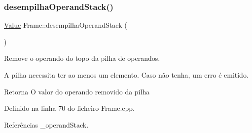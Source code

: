 \subsubsection{\texorpdfstring{desempilha\+Operand\+Stack()}{desempilhaOperandStack()}}
{\footnotesize\ttfamily \hyperlink{structValue}{Value} Frame\+::desempilha\+Operand\+Stack (\begin{DoxyParamCaption}{ }\end{DoxyParamCaption})}



Remove o operando do topo da pilha de operandos. 

A pilha necessita ter ao menos um elemento. Caso não tenha, um erro é emitido. \begin{DoxyReturn}{Retorna}
O valor do operando removido da pilha 
\end{DoxyReturn}


Definido na linha 70 do ficheiro Frame.\+cpp.



Referências \+\_\+operand\+Stack.



